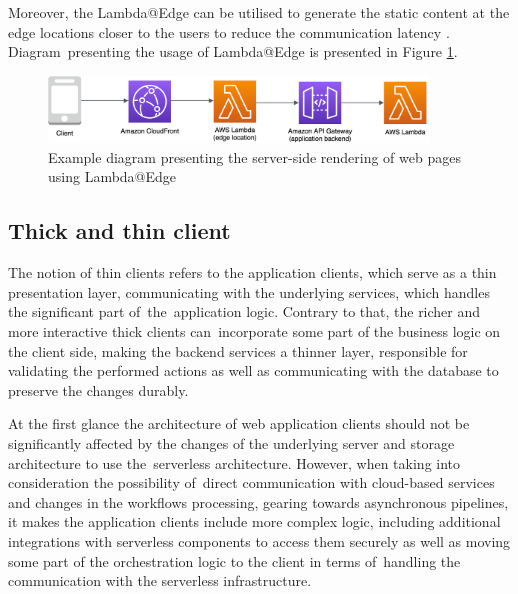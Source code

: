 Moreover, the Lambda@Edge can be utilised to generate the static content at the edge locations closer to the users to reduce the communication latency \cite{BuildingServerSideRenderingForReactInAwsLambda}.
Diagram~presenting the usage of Lambda@Edge is presented in Figure \ref{fig:pattern-client-server-side-rendering-edge}.

\begin{figure}[H]
   \centering
   \includegraphics[width=0.9\textwidth]{assets/04-serverless-for-web-apps/serverSideRenderingEdge.png}
   \caption{Example diagram presenting the server-side rendering of web pages using Lambda@Edge}
   \label{fig:pattern-client-server-side-rendering-edge}
\end{figure}

\subsection{Thick and thin client}

The notion of thin clients refers to the application clients, which serve as a thin presentation layer, communicating with the underlying services, which handles the significant part of~the~application logic.
Contrary to that, the richer and more interactive thick clients can~incorporate some part of the business logic on the client side, making the backend services a thinner layer, responsible for validating the performed actions as well as communicating with the database to preserve the changes durably.

At the first glance the architecture of web application clients should not be significantly affected by the changes of the underlying server and storage architecture to use the~serverless architecture.
However, when taking into consideration the possibility of~direct communication with cloud-based services and changes in the workflows processing, gearing towards asynchronous pipelines, it makes the application clients include more complex logic, including additional integrations with serverless components to access them securely as well as moving some part of the orchestration logic to the client in terms of~handling the communication with the serverless infrastructure.

